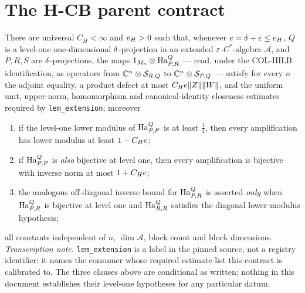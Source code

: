 \section{The H-CB parent contract}\label{sec:hcb}

\begin{lemma}\label{conj:hcb}
There are universal $C_H<\infty$ and $e_H>0$ such that, whenever
$e=\delta+\varepsilon\le e_H$, $Q$ is a level-one one-dimensional
$\delta$-projection in an extended $\varepsilon$-$C^*$-algebra $\mathcal A$, and $P,R,S$ are
$\delta$-projections, the maps $1_{M_{n}}\otimes\mathrm{Ha}^{Q}_{P,R}$ --- read, under the
\textup{COL-HILB} identification, as operators from $\mathbb C^{n}\otimes\mathcal S_{R,Q}$ to
$\mathbb C^{n}\otimes\mathcal S_{P,Q}$ --- satisfy for every $n$ the adjoint equality, a product
defect at most $C_He\lVert Z\rVert\lVert W\rVert$, and the uniform unit, upper-norm, homomorphism
and canonical-identity closeness estimates required by \texttt{lem\_extension}; moreover
\begin{enumerate}
\item if the level-one lower modulus of $\mathrm{Ha}^{Q}_{P,P}$ is at least $\tfrac14$, then every
  amplification has lower modulus at least $1-C_He$;
\item if $\mathrm{Ha}^{Q}_{P,P}$ is \emph{also} bijective at level one, then every amplification is
  bijective with inverse norm at most $1+C_He$;
\item the analogous off-diagonal inverse bound for $\mathrm{Ha}^{Q}_{P,R}$ is asserted \emph{only}
  when $\mathrm{Ha}^{Q}_{P,R}$ is bijective at level one and $\mathrm{Ha}^{Q}_{R,R}$ satisfies the diagonal
  lower-modulus hypothesis;
\end{enumerate}
all constants independent of $n$, $\dim\mathcal A$, block count and block dimensions.
\emph{Transcription note.} \texttt{lem\_extension} is a label in the pinned source, not a
registry identifier: it names the consumer whose required estimate list this contract is
calibrated to. The three clauses above are conditional as written; nothing in this
document establishes their level-one hypotheses for any particular datum.
\end{lemma}

